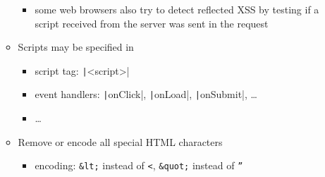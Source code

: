 \documentclass[final]{article}
\begin{document}
\begin{itemize}[nosep]
\begin{itemize}[nosep]
\begin{itemize}[nosep]
                        \item some web browsers also try to detect reflected XSS by testing if a script received from the server was sent in the request
                    \end{itemize}
              \item Scripts may be specified in
                    \begin{itemize}[nosep]
                        \item script tag: \texttt|<script>|
                        \item event handlers: \texttt|onClick|, \texttt|onLoad|, \texttt|onSubmit|, \dots
                        \item \dots
                    \end{itemize}
              \item Remove or encode all special HTML characters
                    \begin{itemize}[nosep]
                        \item encoding: \texttt{\&lt;} instead of \texttt{<}, \texttt{\&quot;} instead of \texttt{''}
                    \end{itemize}
          \end{itemize}
\end{itemize}
\end{document}
